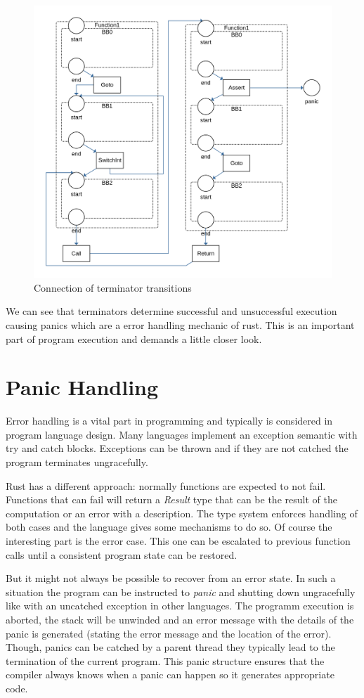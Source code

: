 \begin{figure}
    \centering
    \includegraphics[width=.9\textwidth]{../diagrams/TerminatorsNet.png}
    \caption{Connection of terminator transitions}
    \label{terminators_net}
\end{figure}

We can see that terminators determine successful and unsuccessful execution causing panics which are a error handling mechanic of rust.
This is an important part of program execution and demands a little closer look.

\section{Panic Handling}
Error handling is a vital part in programming and typically is considered in program language design.
Many languages implement an exception semantic with try and catch blocks.
Exceptions can be thrown and if they are not catched the program terminates ungracefully.

Rust has a different approach: normally functions are expected to not fail.
Functions that can fail will return a \textit{Result} type that can be the result of the computation or an error with a description.
The type system enforces handling of both cases and the language gives some mechanisms to do so.
Of course the interesting part is the error case.
This one can be escalated to previous function calls until a consistent program state can be restored.

But it might not always be possible to recover from an error state.
In such a situation the program can be instructed to \textit{panic} and shutting down ungracefully like with an uncatched exception in other languages.
The programm execution is aborted, the stack will be unwinded and an error message with the details of the panic is generated (stating the error message and the location of the error).
Though, panics can be catched by a parent thread they typically lead to the termination of the current program.
This panic structure ensures that the compiler always knows when a panic can happen so it generates appropriate code.

